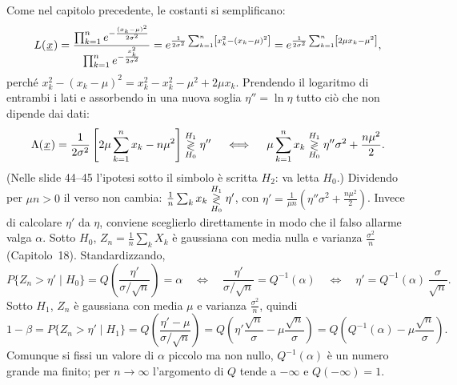 \begin{dimostrazione}
 Come nel capitolo precedente, le costanti si semplificano:
\[ L(\vett{x}) = \frac{\prod_{k=1}^{n} e^{-\frac{(x_k - \mu)^2}{2\sigma^2}}}{\prod_{k=1}^{n} e^{-\frac{x_k^2}{2\sigma^2}}}
   = e^{\frac{1}{2\sigma^2} \sum_{k=1}^{n} \left[ x_k^2 - (x_k - \mu)^2 \right]} = e^{\frac{1}{2\sigma^2}
   \sum_{k=1}^{n} \left[ 2\mu x_k - \mu^2 \right]} , \]
perché $x_k^2 - (x_k - \mu)^2 = x_k^2 - x_k^2 - \mu^2 + 2\mu x_k$.
 Prendendo il logaritmo di entrambi i lati e assorbendo in una nuova soglia $\eta'' = \ln \eta$
tutto ciò che non dipende dai dati:
\[ \Lambda(\vett{x}) = \frac{1}{2\sigma^2} \left[ 2\mu \sum_{k=1}^{n} x_k - n\mu^2 \right] \decidi{H_1}{H_0} \eta''
   \quad\iff\quad \mu \sum_{k=1}^{n} x_k \decidi{H_1}{H_0} \eta'' \sigma^2 + \frac{n \mu^2}{2} . \]
(Nelle slide 44--45 l'ipotesi sotto il simbolo è scritta $H_2$: va letta $H_0$.)
 Dividendo per $\mu n > 0$ il verso non cambia: $\frac{1}{n} \sum_k x_k \decidi{H_1}{H_0}
\eta'$, con $\eta' = \frac{1}{\mu n} \left( \eta'' \sigma^2 + \frac{n \mu^2}{2} \right)$. Invece di calcolare $\eta'$
da $\eta$, conviene sceglierlo direttamente in modo che il falso allarme valga $\alpha$.
 Sotto $H_0$, $Z_n = \frac{1}{n} \sum_k X_k$ è gaussiana con media nulla e varianza
$\frac{\sigma^2}{n}$ (Capitolo~18). Standardizzando,
\[ P\{Z_n > \eta' \mid H_0\} = Q\left( \frac{\eta'}{\sigma / \sqrt{n}} \right) = \alpha \quad\iff\quad
   \frac{\eta'}{\sigma / \sqrt{n}} = Q^{-1}(\alpha) \quad\iff\quad \eta' = Q^{-1}(\alpha)\, \frac{\sigma}{\sqrt{n}} . \]
 Sotto $H_1$, $Z_n$ è gaussiana con media $\mu$ e varianza $\frac{\sigma^2}{n}$, quindi
\[ 1 - \beta = P\{Z_n > \eta' \mid H_1\} = Q\left( \frac{\eta' - \mu}{\sigma / \sqrt{n}} \right) = Q\left(
   \eta' \frac{\sqrt{n}}{\sigma} - \mu \frac{\sqrt{n}}{\sigma} \right) = Q\left( Q^{-1}(\alpha) - \mu
   \frac{\sqrt{n}}{\sigma} \right) . \]
 Comunque si fissi un valore di $\alpha$ piccolo ma non nullo, $Q^{-1}(\alpha)$ è un numero grande ma
finito; per $n \to \infty$ l'argomento di $Q$ tende a $-\infty$ e $Q(-\infty) = 1$.
\end{dimostrazione}

